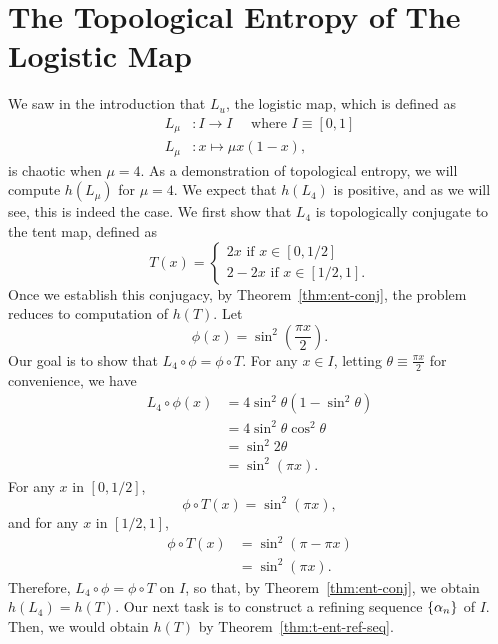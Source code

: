 \documentclass[10pt,twoside,draft]{book}
\begin{document}
\section{The Topological Entropy of The Logistic Map}
We saw in the introduction that $L_u$, the logistic map, which is defined as
\begin{align*}
  L_\mu&: I \to I \quad\mbox{ where } I \equiv [0,1] \\
  L_\mu&: x \mapsto \mu x (1-x),
\end{align*}
is chaotic when $\mu = 4$.
As a demonstration of topological entropy, we will compute $h(L_\mu)$ for $\mu = 4$.
We expect that $h(L_4)$ is positive, and as we will see, this is indeed the case. 
We first show that $L_4$ is topologically conjugate to the tent map, defined as
\begin{equation*}
  T(x) = 
  \begin{cases}
    2x \mbox{ if } x \in [0,1/2] \\
    2 - 2x \mbox{ if } x \in [1/2,1].
  \end{cases}
\end{equation*}
Once we establish this conjugacy, by Theorem~\ref{thm:ent-conj}, the problem reduces to computation of $h(T)$.
Let
\begin{equation*}
  \phi(x) = \sin^2(\frac{\pi x}{2}).
\end{equation*}
Our goal is to show that $L_4 \circ \phi = \phi \circ T$.
For any $x \in I$, letting $\theta \equiv \frac{\pi x}{2}$ for convenience, we have
\begin{align*}
  L_4 \circ \phi(x)
  &= 4\sin^2\theta(1 - \sin^2\theta) \\
  &= 4\sin^2\theta \cos^2\theta \\
  &= \sin^2 2\theta \\
  &= \sin^2 (\pi x).
\end{align*}
For any $x$ in $[0,1/2]$,
\begin{equation*}
  \phi \circ T(x)
  = \sin^2(\pi x),
\end{equation*}
and for any $x$ in $[1/2,1]$,
\begin{align*}
  \phi \circ T(x)
  &= \sin^2(\pi - \pi x) \\
  &= \sin^2(\pi x).
\end{align*}
Therefore, $L_4 \circ \phi = \phi \circ T$ on $I$, so that, by Theorem~\ref{thm:ent-conj}, we obtain $h(L_4) = h(T)$.
Our next task is to construct a refining sequence $\left \{ \alpha_n \right \}$ of $I$.
Then, we would obtain $h(T)$ by Theorem~\ref{thm:t-ent-ref-seq}.
\end{document}

